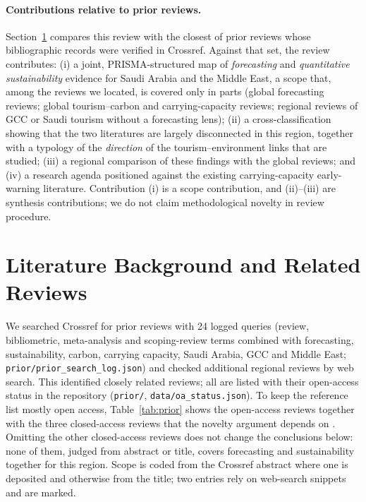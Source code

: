 \documentclass[11pt,a4paper]{article}
\begin{document}
\paragraph{Contributions relative to prior reviews.} Section~\ref{sec:prior} compares this review with the closest of \Npriorrev{} prior reviews whose bibliographic records were verified in Crossref. Against that set, the review contributes: (i) a joint, PRISMA-structured map of \emph{forecasting} and \emph{quantitative sustainability} evidence for Saudi Arabia and the Middle East, a scope that, among the reviews we located, is covered only in parts (global forecasting reviews; global tourism--carbon and carrying-capacity reviews; regional reviews of GCC or Saudi tourism without a forecasting lens); (ii) a cross-classification showing that the two literatures are largely disconnected in this region, together with a typology of the \emph{direction} of the tourism--environment links that are studied; (iii) a regional comparison of these findings with the global reviews; and (iv) a research agenda positioned against the existing carrying-capacity early-warning literature. Contribution (i) is a scope contribution, and (ii)--(iii) are synthesis contributions; we do not claim methodological novelty in review procedure.


\section{Literature Background and Related Reviews}\label{sec:prior}
We searched Crossref for prior reviews with 24 logged queries (review, bibliometric, meta-analysis and scoping-review terms combined with forecasting, sustainability, carbon, carrying capacity, Saudi Arabia, GCC and Middle East; \texttt{prior/prior\_search\_log.json}) and checked additional regional reviews by web search. This identified \Npriorrev{} closely related reviews; all are listed with their open-access status in the repository (\texttt{prior/}, \texttt{data/oa\_status.json}). To keep the reference list mostly open access, Table~\ref{tab:prior} shows the open-access reviews together with the three closed-access reviews that the novelty argument depends on \citep{Jiao2019,Sun2022,Saleh2021}. Omitting the other closed-access reviews does not change the conclusions below: none of them, judged from abstract or title, covers forecasting and sustainability together for this region. Scope is coded from the Crossref abstract where one is deposited and otherwise from the title; two entries rely on web-search snippets and are marked.
\end{document}
